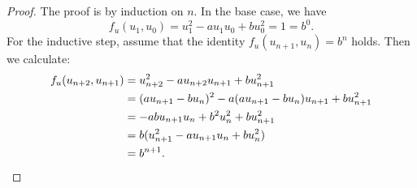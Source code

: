 \begin{proof}
  The proof is by induction on $n$. In the base case, we have
  \begin{equation*}
    f_u(u_{1},u_0)=u_{1}^2 - au_{1}u_0 + bu_0^2=1=b^0.
  \end{equation*}
  For the inductive step, assume that the identity $f_u(u_{n+1},u_n)= b^n$ holds. Then we calculate:
  \begin{align*}
    f_u(u_{n+2},u_{n+1})
    & = u_{n+2}^2 - au_{n+2}u_{n+1} + bu_{n+1}^2 \\
    & = (a u_{n+1} -b u_n)^2 - a(a u_{n+1} -b u_n)u_{n+1} + b u_{n+1}^2 \\
    & = -ab u_{n+1}u_n + b^2 u_n^2 + bu_{n+1}^2 \\
    & = b(u_{n+1}^2 - au_{n+1}u_n + b u_n^2) \\
    & = b^{n+1}.\qedhere
  \end{align*}
\end{proof}

